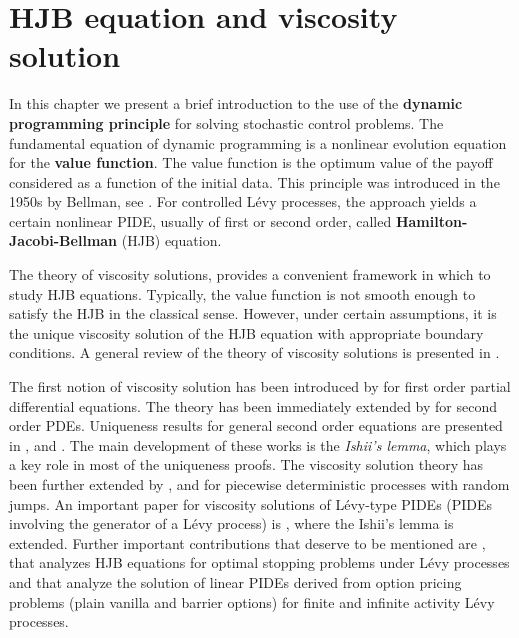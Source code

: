 

\chapter{HJB equation and viscosity solution}\label{Chapter4}
\minitoc%

\vspace{5em}

In this chapter we present a brief introduction to the use of the \textbf{dynamic programming principle} for solving stochastic control problems. 
The fundamental equation of dynamic programming is a nonlinear evolution equation for the \textbf{value function}.
The value function is the optimum value of the payoff considered as a function of the initial data.
This principle was introduced in the 1950s by Bellman, see \cite{Bellman}. 
For controlled Lévy processes,
the approach yields a certain nonlinear PIDE, usually of first or second order, called \textbf{Hamilton-Jacobi-Bellman} (HJB) equation. 

The theory of viscosity solutions, provides a convenient framework in which to study HJB equations.
Typically, the value function is not smooth enough to satisfy the HJB in the classical sense. However, under certain assumptions, it is the unique viscosity
solution of the HJB equation with appropriate boundary conditions. A general review of the theory of viscosity solutions is presented in \cite{CIL92}.

The first notion of viscosity solution has been introduced by \cite{CL83} for first order partial differential equations. The theory has
been immediately extended by \cite{PLL83} for second order PDEs.
Uniqueness results for general second order equations are presented in \cite{Je88}, \cite{Is89} and \cite{IsLi90}. 
The main development of these works is the \emph{Ishii's lemma}, which plays a key role in most of the uniqueness proofs.
The viscosity solution theory has been further extended by \cite{Soner86b}, \cite{Soner86} and \cite{Sayah91} for piecewise deterministic processes with random jumps.
An important paper for viscosity solutions of Lévy-type PIDEs (PIDEs involving the generator of a Lévy process) is \cite{BaIm08}, where the Ishii's
lemma is extended. 
Further important contributions that deserve to be mentioned are \cite{Ph98}, that analyzes HJB equations for optimal stopping problems under Lévy processes and \cite{CoVo05} that analyze
the solution of linear PIDEs derived from option pricing problems (plain vanilla and barrier options) for finite and infinite activity Lévy processes.



